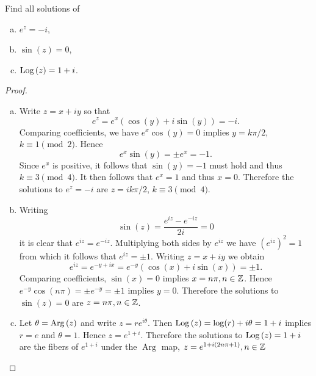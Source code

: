 \documentclass[12pt]{amsart}
\begin{document}
\begin{thm}
  Find all solutions of 
  \begin{enumerate}[(a)]
  \item
    $e^z = -i$,
  \item
    $\sin(z) = 0$,
  \item
    $\operatorname{Log}\left(z\right) = 1 + i$.
  \end{enumerate}
  
  \begin{proof}
    \begin{enumerate}[(a)]
    \item
      Write $z = x + iy$ so that $$e^z = e^x(\cos(y) + i\sin(y)) = -i.$$
      Comparing coefficients, we have $e^x\cos(y) = 0$ implies $y = k\pi/2$, $k \equiv 1 \pmod{2}$.
      Hence $$e^x\sin(y) = \pm e^x = -1.$$
      Since $e^x$ is positive, it follows that $\sin(y) = -1$ must hold and thus $k \equiv 3 \pmod{4}$. 
      It then follows that $e^x = 1$ and thus $x = 0$.
      Therefore the solutions to $e^z = -i$ are $z = ik\pi/2$, $k \equiv 3 \pmod{4}$.
    \item
      Writing $$\sin(z) = \frac{e^{iz} - e^{-iz}}{2i} = 0$$
      it is clear that $e^{iz} = e^{-iz}$.
      Multiplying both sides by $e^{iz}$ we have $(e^{iz})^2 = 1$ from which it follows that $e^{iz} = \pm 1$.
      Writing $z = x + iy$ we obtain $$e^{iz} = e^{-y + ix} = e^{-y}(\cos(x) + i\sin(x)) = \pm 1.$$
      Comparing coefficients, $\sin(x) = 0$ implies $x = n\pi, n \in \mathbb{Z}$.
      Hence $e^{-y}\cos(n\pi) = \pm e^{-y} = \pm {1}$ implies $y = 0$.
      Therefore the solutions to $\sin(z) = 0$ are $z = n\pi, n \in \mathbb{Z}$.
    \item
      Let $\theta = \operatorname{Arg}\left(z\right)$ and write $z = re^{i\theta}$.
      Then $\operatorname{Log}\left(z\right) = \log(r) + i\theta = 1 + i$ implies $r = e$ and $\theta = 1$.
      Hence $z = e^{1 + i}$.
      Therefore the solutions to $\operatorname{Log}\left(z\right) = 1 + i$ are the fibers of $e^{1 + i}$ under the $\operatorname{Arg}$ map, $z = e^{1 + i(2n\pi + 1)}, n \in \mathbb{Z}$
    \end{enumerate}
  \end{proof}
\end{thm}
\end{document}
